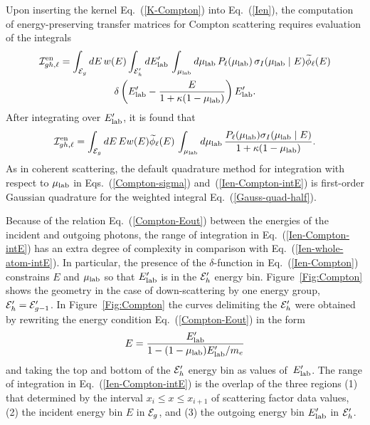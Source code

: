 Upon inserting the kernel Eq.~(\ref{K-Compton}) into Eq.~(\ref{Ien}),
the computation of energy-preserving transfer matrices
for Compton scattering requires evaluation of the integrals
\begin{multline}
    {\cal I}^{\text{en}}_{gh,\ell} =
     \int_{{\cal E}_g} dE \,  w(E)
     \int_{{\cal E}_h' } dE_{\text{lab}}' \, \int_{\mu_{\text{lab}}} d\mu_{\text{lab}}  \, 
     P_\ell ( \mu_{\text{lab}} ) \, \sigma_I(\mu_{\text{lab}} \mid E)
      \widetilde \phi_\ell(E) \\
      \delta \left(
         E_{\text{lab}}' - \frac{E}{1 + \kappa(1 - \mu_{\text{lab}})}
     \right)E_{\text{lab}}'.
  \label{Ien-Compton}
\end{multline}
After integrating over $E_{\text{lab}}'$, it is found that
\begin{equation}
    {\cal I}^{\text{en}}_{gh,\ell} =
     \int_{{\cal E}_g} dE \, E  w(E) \widetilde \phi_\ell(E) \,
     \int_{\mu_{\text{lab}}} d\mu_{\text{lab}}  \,  
         \frac{P_\ell ( \mu_{\text{lab}} ) \sigma_I(\mu_{\text{lab}} \mid E)}{1 + \kappa(1 - \mu_{\text{lab}})}.
  \label{Ien-Compton-intE}
\end{equation}
As in coherent scattering, the default quadrature method for integration
with respect to $\mu_{\text{lab}}$ in Eqs.~(\ref{Compton-sigma}) and~(\ref{Ien-Compton-intE})
is first-order 
Gaussian quadrature for the weighted integral Eq.~(\ref{Gauss-quad-half}).

\begin{figure}

\end{figure}

Because of the relation Eq.~(\ref{Compton-Eout}) between the energies
of the incident and outgoing photons, the range of integration in 
Eq.~(\ref{Ien-Compton-intE}) has an extra degree of complexity in
comparison with Eq.~(\ref{Ien-whole-atom-intE}).  In particular,
the presence of the 
$\delta$-function in Eq.~(\ref{Ien-Compton}) constrains $E$ and
$\mu_{\text{lab}}$ so that $E_{\text{lab}}'$ is in the ${\cal E}_h'$ energy bin.  Figure~\ref{Fig:Compton}
shows the geometry in the case of down-scattering by one
energy group, ${\cal E}_h' = {\cal E}'_{g-1}$.  In Figure~\ref{Fig:Compton} the curves
delimiting the ${\cal E}_h'$ were obtained by rewriting the energy
condition Eq.~(\ref{Compton-Eout}) in the form
$$
  E = \frac{E_{\text{lab}}'}{1 - (1 - \mu_{\text{lab}})E_{\text{lab}}'/m_e}
$$
and taking the top and bottom of the
${\cal E}_h'$ energy bin as values of~$E_{\text{lab}}'$.  The range of integration in
Eq.~(\ref{Ien-Compton-intE}) is the overlap of the three regions
(1) that determined by the interval $x_i \le x \le x_{i+1}$
of scattering factor data values,
(2) the incident energy bin $E$ in ${\cal E}_g$, and
(3) the outgoing energy bin $E_{\text{lab}}'$ in ${\cal E}_h'$.

